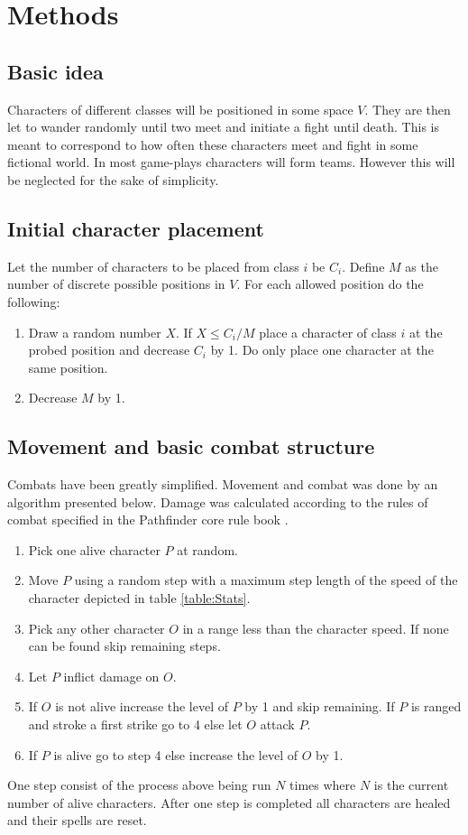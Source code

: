 \documentclass[a4paper,12pt]{article}
\begin{document}
\newpage
\section{Methods}\label{sec:Methods}
\subsection{Basic idea}
Characters of different classes will be positioned in some space $V$. They are then let to wander randomly until two meet and initiate a fight until death. This is meant to correspond to how often these characters meet and fight in some fictional world. 
In most game-plays characters will form teams. However this will be neglected for the sake of simplicity.

\subsection{Initial character placement}
Let the number of characters to be placed from class $i$ be $C_i$.
Define $M$ as the number of discrete possible positions in $V$.
For each allowed position do the following:
\begin{enumerate}
	\item Draw a random number $X$. If $X \leq C_i/M$ place a character of class $i$ at the probed position and decrease $C_i$ by 1.
		Do only place one character at the same position.
	\item Decrease $M$ by 1.
\end{enumerate}


\subsection{Movement and basic combat structure}
Combats have been greatly simplified. Movement and combat was done by an algorithm presented below.
Damage was calculated according to the rules of combat specified in the Pathfinder core rule book \cite{rule_book}.
\begin{enumerate}
	\item Pick one alive character $P$ at random.
	\item Move $P$ using a random step with a maximum step length of the speed of the character depicted in table \ref{table:Stats}.
	\item Pick any other character $O$ in a range less than the character speed. If none can be found skip remaining steps.
	\item Let $P$ inflict damage on $O$.
	\item If $O$ is not alive increase the level of $P$ by 1 and skip remaining. 
	If $P$ is ranged and stroke a first strike go to 4 else let $O$ attack $P$.
	\item If $P$ is alive go to step 4 else increase the level of $O$ by 1.
\end{enumerate}
One step consist of the process above being run $N$ times where $N$ is the current number of alive characters.
After one step is completed all characters are healed and their spells are reset.
\end{document}
